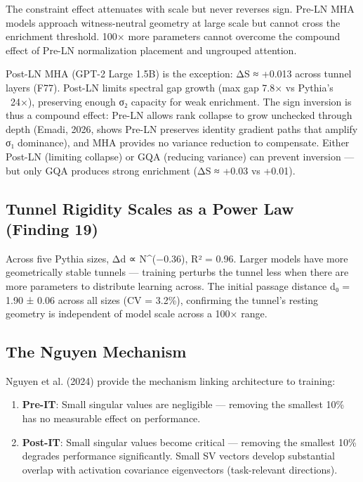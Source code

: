 \documentclass[12pt]{article}
\begin{document}
The constraint effect attenuates with scale but never reverses sign. Pre-LN MHA models approach witness-neutral geometry at large scale but cannot cross the enrichment threshold. 100× more parameters cannot overcome the compound effect of Pre-LN normalization placement and ungrouped attention.

Post-LN MHA (GPT-2 Large 1.5B) is the exception: ΔS ≈ +0.013 across tunnel layers (F77). Post-LN limits spectral gap growth (max gap 7.8× vs Pythia's ~24×), preserving enough σ₂ capacity for weak enrichment. The sign inversion is thus a compound effect: Pre-LN allows rank collapse to grow unchecked through depth (Emadi, 2026, shows Pre-LN preserves identity gradient paths that amplify σ₁ dominance), and MHA provides no variance reduction to compensate. Either Post-LN (limiting collapse) or GQA (reducing variance) can prevent inversion — but only GQA produces strong enrichment (ΔS ≈ +0.03 vs +0.01).

\subsection{Tunnel Rigidity Scales as a Power Law (Finding 19)}

Across five Pythia sizes, Δd ∝ N^(−0.36), R² = 0.96. Larger models have more geometrically stable tunnels — training perturbs the tunnel less when there are more parameters to distribute learning across. The initial passage distance d₀ = 1.90 ± 0.06 across all sizes (CV = 3.2\%), confirming the tunnel's resting geometry is independent of model scale across a 100× range.

\subsection{The Nguyen Mechanism}

Nguyen et al. (2024) provide the mechanism linking architecture to training:

\begin{enumerate}
\item \textbf{Pre-IT}: Small singular values are negligible — removing the smallest 10\% has no measurable effect on performance.
\item \textbf{Post-IT}: Small singular values become critical — removing the smallest 10\% degrades performance significantly. Small SV vectors develop substantial overlap with activation covariance eigenvectors (task-relevant directions).
\end{enumerate}
\end{document}
